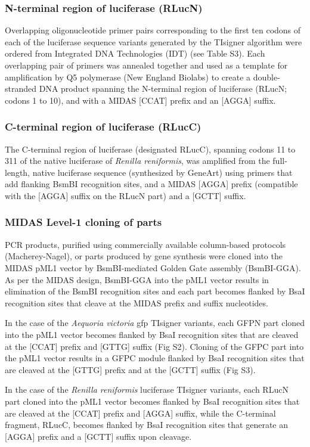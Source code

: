 \subsubsection{N-terminal region of luciferase (RLucN)}
Overlapping oligonucleotide primer pairs corresponding to the first ten codons of each of the luciferase sequence variants generated by the TIsigner algorithm were ordered from Integrated DNA Technologies (IDT) (see Table S3). Each overlapping pair of primers was annealed together and used as a template for amplification by Q5 polymerase (New England Biolabs) to create a double-stranded DNA product spanning the N-terminal region of luciferase (RLucN; codons 1 to 10), and with a MIDAS [CCAT] prefix and an [AGGA] suffix.

\subsubsection{C-terminal region of luciferase (RLucC)}
The C-terminal region of luciferase (designated RLucC), spanning codons 11 to 311 of the native luciferase of \textit{Renilla reniformis}, was amplified from the full-length, native luciferase sequence (synthesized by GeneArt) using primers that add flanking BsmBI recognition sites, and a MIDAS [AGGA] prefix (compatible with the [AGGA] suffix on the RLucN part) and a [GCTT] suffix.


\subsubsection{MIDAS Level-1 cloning of parts}
PCR products, purified using commercially available column-based protocols (Macherey-Nagel), or parts produced by gene synthesis were cloned into the MIDAS pML1 vector by BsmBI-mediated Golden Gate assembly (BsmBI-GGA). As per the MIDAS design, BsmBI-GGA into the pML1 vector results in elimination of the BsmBI recognition sites and each part becomes flanked by BsaI recognition sites that cleave at the MIDAS prefix and suffix nucleotides.

In the case of the \textit{Aequoria victoria} gfp TIsigner variants, each GFPN part cloned into the pML1 vector becomes flanked by BsaI recognition sites that are cleaved at the [CCAT] prefix and [GTTG] suffix (Fig S2). Cloning of the GFPC part into the pML1 vector results in a GFPC module flanked by BsaI recognition sites that are cleaved at the [GTTG] prefix and at the [GCTT] suffix (Fig S3).

In the case of the \textit{Renilla reniformis} luciferase TIsigner variants, each RLucN part cloned into the pML1 vector becomes flanked by BsaI recognition sites that are cleaved at the [CCAT] prefix and [AGGA] suffix, while the C-terminal fragment, RLucC, becomes flanked by BsaI recognition sites that generate an [AGGA] prefix and a [GCTT] suffix upon cleavage.

